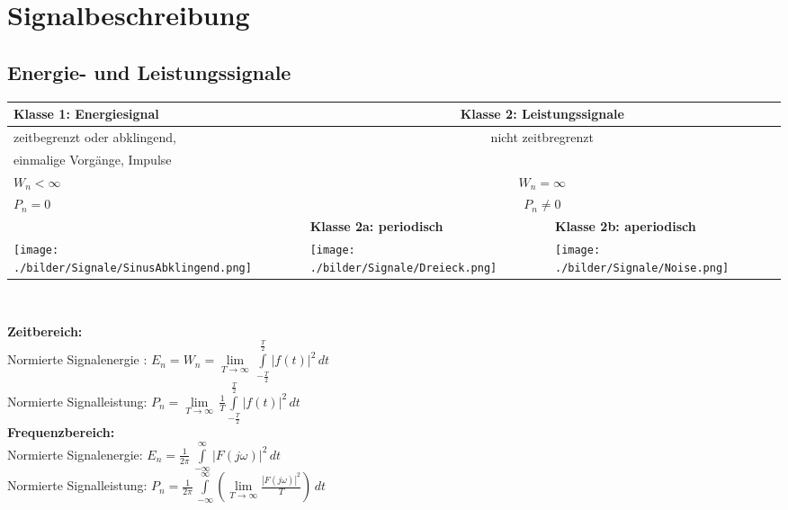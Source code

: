 \section{Signalbeschreibung }
\subsection{Energie- und Leistungssignale }
\begin{tabular}{|l|l|l|}
	\hline
	\textbf{Klasse 1: Energiesignal} & \multicolumn{2}{|c|}{\textbf{Klasse 2: Leistungssignale}} \\
	\hline
	zeitbegrenzt oder abklingend,  	& \multicolumn{2}{|c|}{nicht zeitbregrenzt} \\ 
	einmalige Vorgänge, Impulse		& \multicolumn{2}{|c|}{}\\
	$W_n < \infty$		 	& \multicolumn{2}{|c|}{$W_n = \infty $} \\
	$P_n = 0$				& \multicolumn{2}{|c|}{$P_n \neq 0 $} \\
	\hline
							& \textbf{Klasse 2a: periodisch}	& \textbf{Klasse 2b: aperiodisch} \\
	\hline
	\parbox[c][4cm]{5.9cm}{\texttt{[image: ./bilder/Signale/SinusAbklingend.png]}} &
	\parbox[c][4cm]{5.9cm}{\texttt{[image: ./bilder/Signale/Dreieck.png]}} &
	\parbox[c][4cm]{5.9cm}{\texttt{[image: ./bilder/Signale/Noise.png]}} \\
	\hline
\end{tabular} \\
\begin{multicols}{2}
 \textbf{Zeitbereich:} \\
 Normierte Signalenergie : $E_n = W_n = \lim\limits_{T\to\infty}\,\int\limits_{-\frac{T}{2}}^\frac{T}{2}|f(t)|^2\,dt$ \\
 Normierte Signalleistung: $P_n = \lim\limits_{T\to\infty}\,
 \frac{1}{T}\int\limits_{-\frac{T}{2}}^\frac{T}{2}|f(t)|^2\,dt$ \\
 \textbf{Frequenzbereich:} \\
 Normierte Signalenergie: $E_n = \frac{1}{2\pi}\,\int\limits_{-\infty}^\infty|F(j\omega)|^2\,dt$ \\
 Normierte Signalleistung: $P_n = \frac{1}{2\pi}\,\int\limits_{-\infty}^\infty\left(
 \lim\limits_{T\to\infty}\frac{|F(j\omega)|^2}{T}\right)\,dt$
\end{multicols}


